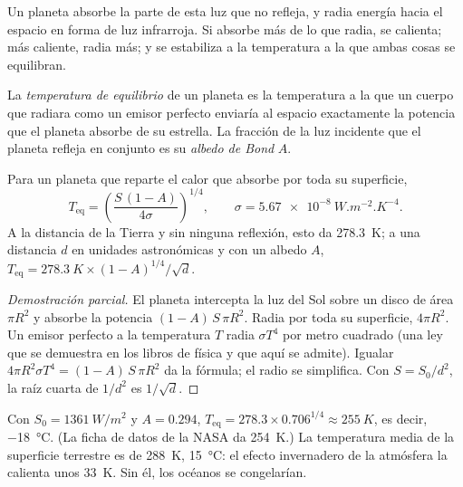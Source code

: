 Un planeta absorbe la parte de esta luz que no refleja, y radia energía hacia
el espacio en forma de luz infrarroja. Si absorbe más de lo que radia, se
calienta; más caliente, radia más; y se estabiliza a la temperatura a la que
ambas cosas se equilibran.

\begin{definition}\label{def:g10:habitable-planet:equilibrium-temperature}
La \emph{temperatura de equilibrio} de un
planeta es la temperatura a la que un cuerpo que radiara como un emisor
perfecto enviaría al espacio exactamente la potencia que el planeta absorbe
de su estrella. La fracción de la luz incidente que el planeta refleja en
conjunto es su \emph{albedo de Bond} $A$.
\end{definition}

\begin{proposition}\label{prop:g10:habitable-planet:teq}
Para un planeta que reparte el calor que absorbe por toda su superficie,
\[
  T_{\mathrm{eq}} = \left(\frac{S\,(1-A)}{4\sigma}\right)^{1/4},
  \qquad \sigma = \qty{5.67e-8}{W.m^{-2}.K^{-4}}.
\]
A la distancia de la Tierra y sin ninguna reflexión, esto da
\qty{278.3}{K}; a una distancia $d$ en unidades astronómicas y con un albedo
$A$, $T_{\mathrm{eq}} = \qty{278.3}{K} \times (1-A)^{1/4}/\sqrt{d}$.
\end{proposition}

\begin{proof}[Demostración parcial]
El planeta intercepta la luz del Sol sobre un disco de área $\pi R^2$ y
absorbe la potencia $(1-A)\,S\,\pi R^2$. Radia por toda su superficie,
$4\pi R^2$. Un emisor perfecto a la temperatura $T$ radia $\sigma T^4$ por
metro cuadrado (una ley que se demuestra en los libros de física y que aquí
se admite). Igualar $4\pi R^2 \sigma T^4 = (1-A)\,S\,\pi R^2$ da la fórmula;
el radio se simplifica. Con $S = S_0/d^2$, la raíz cuarta de $1/d^2$ es
$1/\sqrt d$.
\end{proof}

\begin{example}[La Tierra]\label{ex:g10:habitable-planet:earth}
Con $S_0 = \qty{1361}{W/m^2}$ y $A = 0.294$,
$T_{\mathrm{eq}} = 278.3 \times 0.706^{1/4} \approx \qty{255}{K}$, es decir,
\qty{-18}{\degreeCelsius}. (La ficha de datos de la NASA da \qty{254}{K}.)
La temperatura media de la superficie terrestre es de \qty{288}{K},
\qty{15}{\degreeCelsius}: el efecto invernadero de la atmósfera la calienta
unos \qty{33}{K}. Sin él, los océanos se congelarían.
\end{example}

